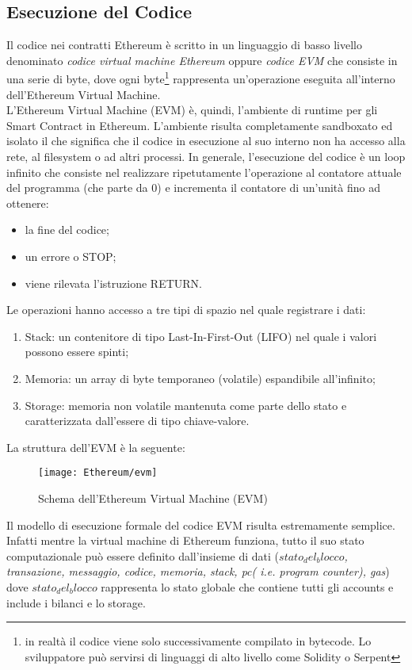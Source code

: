 \subsection{Esecuzione del Codice}
%
Il codice nei contratti Ethereum è scritto in un linguaggio di basso livello denominato \emph{codice virtual machine Ethereum} oppure \emph{codice EVM} che consiste in una serie di byte, dove ogni byte\footnote{in realtà il codice viene solo successivamente compilato in bytecode. Lo sviluppatore può servirsi di linguaggi di alto livello come Solidity o Serpent} rappresenta un'operazione eseguita all'interno dell'Ethereum Virtual Machine. \\ 
L'Ethereum Virtual Machine (EVM) è, quindi, l'ambiente di runtime per gli Smart Contract in Ethereum. L'ambiente risulta completamente sandboxato ed isolato il che significa che il codice in esecuzione al suo interno non ha accesso alla rete, al filesystem o ad altri processi. In generale, l'esecuzione del codice è un loop infinito che consiste nel realizzare ripetutamente l'operazione al contatore attuale del programma (che parte da 0) e incrementa il contatore di un'unità fino ad ottenere:
\begin{itemize}
	\item la fine del codice;
	\item un errore o STOP;
	\item viene rilevata l'istruzione RETURN.
\end{itemize}%
Le operazioni hanno accesso a tre tipi di spazio nel quale registrare i dati:
\begin{enumerate}
	\item Stack: un contenitore di tipo Last-In-First-Out (LIFO) nel quale i valori possono essere spinti;
	\item Memoria: un array di byte temporaneo (volatile) espandibile all'infinito;
	\item Storage: memoria non volatile mantenuta come parte dello stato e caratterizzata dall'essere di tipo chiave-valore.
\end{enumerate}%
La struttura dell'EVM è la seguente:
\begin{center}
	\begin{figure}[h!]
		\centering
		\texttt{[image: Ethereum/evm]}
		\caption{Schema dell'Ethereum Virtual Machine (EVM)}
		\label{fig:schema dell'ethereum virtual machine}
	\end{figure}
\end{center}
Il modello di esecuzione formale del codice EVM risulta estremamente semplice. Infatti mentre la virtual machine di Ethereum funziona, tutto il suo stato computazionale può essere definito dall'insieme di dati (\emph{$stato_del_blocco$, transazione, messaggio, codice, memoria, stack, pc( i.e. program counter), gas}) dove $stato_del_blocco$ rappresenta lo stato globale che contiene tutti gli accounts e include i bilanci e lo storage. 
%

